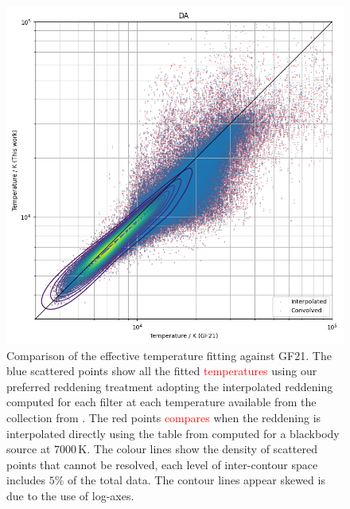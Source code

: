 \documentclass[fleqn,usenatbib]{rasti}
\begin{document}
\begin{figure}
    \centering
    \includegraphics[width=\columnwidth]{compare_fusillo_edr3.png}
    \caption{Comparison of the effective temperature fitting against GF21. The blue scattered points show all the fitted \textcolor{red}{temperatures} using our preferred reddening treatment adopting the interpolated reddening computed for each filter at each temperature available from the collection from \citet{2010MmSAI..81..921K}. The red points \textcolor{red}{compares} when the reddening is interpolated directly using the table from \citet{2011ApJ...737..103S} computed for a blackbody source at $7000$\,K. The colour lines show the density of scattered points that cannot be resolved, each level of inter-contour space includes $5\%$ of the total data. The contour lines appear skewed is due to the use of log-axes.}
    \label{fig:comparison}
\end{figure}
\end{document}
